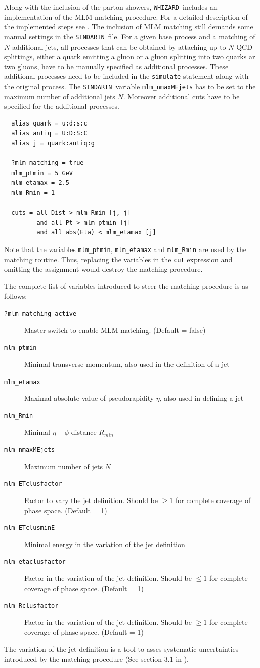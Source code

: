 \documentclass[12pt]{book}
\newcommand{\ttt}[1]{\texttt{#1}}
\newcommand{\whizard}{\texttt{WHIZARD}}
\newcommand{\sindarin}{\texttt{SINDARIN}}
\begin{document}
Along with the inclusion of the parton showers, \whizard\ includes an implementation of the MLM matching procedure. For a detailed description of the implemented steps see \cite{Kilian:2011ka}. The inclusion of MLM matching still demands some manual settings in the \sindarin\ file. For a given base process and a matching of $N$ additional jets, all processes that can be obtained by attaching up to $N$ QCD splittings, either a quark emitting a gluon or a gluon splitting into two quarks ar two gluons, have to be manually specified as additional processes. These additional processes need to be included in the \ttt{simulate} statement along with the original process. The \sindarin\ variable \texttt{mlm\_nmaxMEjets} has to be set to the maximum number of additional jets $N$. Moreover additional cuts have to be specified for the additional processes. 
\begin{verbatim}
  alias quark = u:d:s:c
  alias antiq = U:D:S:C
  alias j = quark:antiq:g

  ?mlm_matching = true
  mlm_ptmin = 5 GeV
  mlm_etamax = 2.5
  mlm_Rmin = 1

  cuts = all Dist > mlm_Rmin [j, j]
         and all Pt > mlm_ptmin [j]
         and all abs(Eta) < mlm_etamax [j]
\end{verbatim}
Note that the variables \ttt{mlm\_ptmin}, \ttt{mlm\_etamax} and \ttt{mlm\_Rmin} are used by the matching routine. Thus, replacing the variables in the \ttt{cut} expression and omitting the assignment would destroy the matching procedure. 

The complete list of variables introduced to steer the matching procedure is as follows:
\begin{description}
\item[\texttt{?mlm\_matching\_active}] Master switch to enable MLM matching. (Default = false) 
\item[\texttt{mlm\_ptmin}] Minimal transverse momentum, also used in the definition of a jet 
\item[\texttt{mlm\_etamax}] Maximal absolute value of pseudorapidity $\eta$, also used in defining a jet 
\item[\texttt{mlm\_Rmin}] Minimal $\eta-\phi$ distance $R_{min}$  
\item[\texttt{mlm\_nmaxMEjets}] Maximum number of jets $N$  
\item[\texttt{mlm\_ETclusfactor}] Factor to vary the jet definition. Should be $\geq 1$ for complete coverage of phase space. (Default = 1) 
\item[\texttt{mlm\_ETclusminE}] Minimal energy in the variation of the jet definition 
\item[\texttt{mlm\_etaclusfactor}] Factor in the variation of the jet definition. Should be $\leq 1$ for complete coverage of phase space. (Default = 1) 
\item[\texttt{mlm\_Rclusfactor}] Factor in the variation of the jet definition. Should be $\ge 1$ for complete coverage of phase space. (Default = 1) 
\end{description}
The variation of the jet definition is a tool to asses systematic uncertainties introduced by the matching procedure (See section 3.1 in \cite{Kilian:2011ka}).
	
\end{document}
